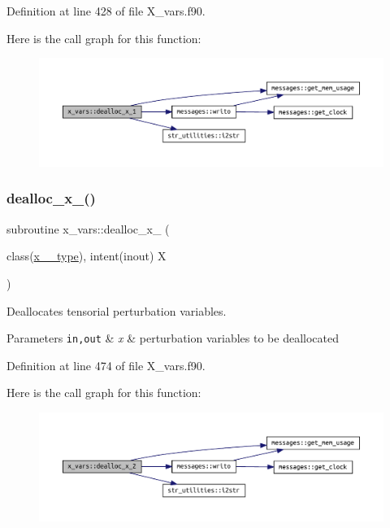 Definition at line 428 of file X\+\_\+vars.\+f90.

Here is the call graph for this function\+:\nopagebreak
\begin{figure}[H]
\begin{center}
\leavevmode
\includegraphics[width=350pt]{namespacex__vars_a20679fb70a3dbfcdf2479b1219b847d1_cgraph}
\end{center}
\end{figure}
\mbox{\label{namespacex__vars_ac052defbe764e6d02f436bd29d72db6d}} 
\subsubsection{\texorpdfstring{dealloc\+\_\+x\+\_()}{dealloc\_x\_2()}}
{\footnotesize\ttfamily subroutine x\+\_\+vars\+::dealloc\+\_\+x\+\_ (\begin{DoxyParamCaption}\item[{class(\hyperlink{structx__vars_1_1x__2__type}{x\+\_\+2\+\_\+type}), intent(inout)}]{X }\end{DoxyParamCaption})}



Deallocates tensorial perturbation variables. 


\begin{DoxyParams}[1]{Parameters}
\mbox{\tt in,out}  & {\em x} & perturbation variables to be deallocated \\
\hline
\end{DoxyParams}


Definition at line 474 of file X\+\_\+vars.\+f90.

Here is the call graph for this function\+:\nopagebreak
\begin{figure}[H]
\begin{center}
\leavevmode
\includegraphics[width=350pt]{namespacex__vars_ac052defbe764e6d02f436bd29d72db6d_cgraph}
\end{center}
\end{figure}
\mbox{\label{namespacex__vars_a327c74a0fa8c50aa2ed812062bd82436}} 
